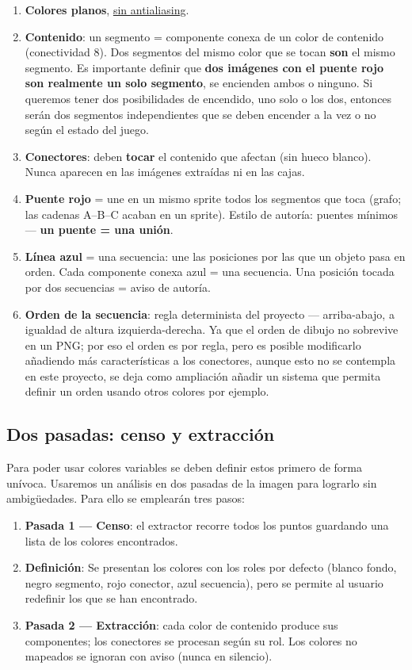 \begin{enumerate}
	\item \textbf{Colores planos}, \underline{sin antialiasing}.
	\item \textbf{Contenido}: un segmento = componente conexa de un color de contenido (conectividad 8). Dos segmentos del mismo color que se tocan \textbf{son} el mismo segmento. Es importante definir que \textbf{dos imágenes con el puente rojo son realmente un solo segmento}, se encienden ambos o ninguno. Si queremos tener dos posibilidades de encendido, uno solo o los dos, entonces serán dos segmentos independientes que se deben encender a la vez o no según el estado del juego.
	\item \textbf{Conectores}: deben \textbf{tocar} el contenido que afectan (sin hueco blanco). Nunca aparecen en las imágenes extraídas ni en las cajas.
	\item \textbf{Puente rojo} = une en un mismo sprite todos los segmentos que toca (grafo; las cadenas A–B–C acaban en un sprite). Estilo de autoría: puentes mínimos — \textbf{un puente = una unión}.
	\item \textbf{Línea azul} = una secuencia: une las posiciones por las que un objeto pasa en orden. Cada componente conexa azul = una secuencia. Una posición tocada por dos secuencias = aviso de autoría.
	\item \textbf{Orden de la secuencia}: regla determinista del proyecto — arriba-abajo, a igualdad de altura izquierda-derecha. Ya que el orden de dibujo no sobrevive en un PNG; por eso el orden es por regla, pero es posible modificarlo añadiendo más características a los conectores, aunque esto no se contempla en este proyecto, se deja como ampliación añadir un sistema que permita definir un orden usando otros colores por ejemplo.
\end{enumerate}

\subsection{Dos pasadas: censo y extracción}

Para poder usar colores variables se deben definir estos primero de forma unívoca. Usaremos un análisis en dos pasadas de la imagen para lograrlo sin ambigüedades. Para ello se emplearán tres pasos:

\begin{enumerate}
	\item \textbf{Pasada 1 — Censo}: el extractor recorre todos los puntos guardando una lista de los colores encontrados.	
	\item \textbf{Definición}: Se presentan los colores con los roles por defecto (blanco fondo, negro segmento, rojo conector, azul secuencia), pero se permite al usuario redefinir los que se han encontrado.
	\item \textbf{Pasada 2 — Extracción}: cada color de contenido produce sus componentes; los conectores se procesan según su rol. Los colores no mapeados se ignoran con aviso (nunca en silencio).
\end{enumerate}

